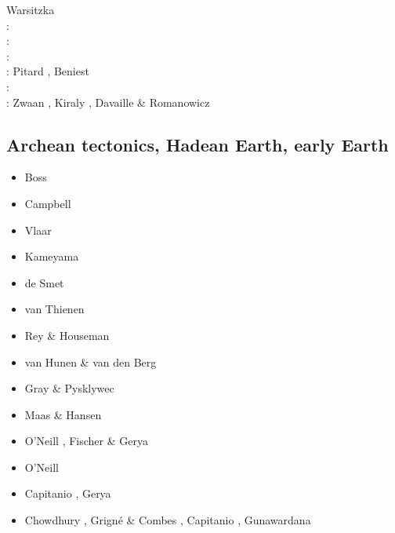 {                    Warsitzka \etal \cite{wakk13}\\
\twothousandfifteen: \cite{casw15}\cite{rods15}\cite{kiff15}\cite{chsd15}\\
\twothousandsixteen: \cite{scbb16}\cite{chss16}\\
\twothousandseventeen: \cite{casw17}\\
\twothousandeighteen: Pitard \etal \cite{pirf18}, Beniest \etal \cite{bews18} \\
\twothousandnineteen: \cite{mocb19}\cite{sccs19}\cite{muwm19}\cite{fegb19}\\
\twothousandtwenty: Zwaan \etal \cite{zwsr20}, Kiraly \etal \cite{kiph20},
                    Davaille \& Romanowicz \cite{daro20}
}

\subsection{Archean tectonics, Hadean Earth, early Earth}

\begin{scriptsize}
\begin{itemize}
\item[\nineteeneightyfour] Boss \etal \cite{boas84}
\item[\nineteeneightynine] Campbell \etal \cite{cagh89}
\item[\nineteenninetyfour] Vlaar \etal \cite{vlvv94}
\item[\nineteenninetysix] Kameyama \etal \cite{kafo96}
\item[\twothousand] de Smet \etal \cite{devv00b}
\item[\twothousandfour] van Thienen \etal \cite{vavv04,vavv04b}
\item[\twothousandsix] Rey \& Houseman \cite{reho06}
\item[\twothousandeight] van Hunen \& van den Berg \cite{vava08}
\item[\twothousandten] Gray \& Pysklywec \cite{grpy10}
\item[\twothousandfifteen] Maas \& Hansen \cite{maha15}
\item[\twothousandsixteen] O'Neill \cite{onlw16}, Fischer \& Gerya \cite{fige16}
\item[\twothousandseventeen] O'Neill \etal \cite{onmz17}
\item[\twothousandnineteen] Capitanio \etal \cite{canc19}, Gerya \cite{gery19}
\item[\twothousandtwenty] Chowdhury \etal{} \cite{chcg20}, Grign\'e \& Combes \cite{grco20},
                          Capitanio \etal \cite{canc20}, Gunawardana \etal \cite{gumc20}
\end{itemize}
\end{scriptsize}

